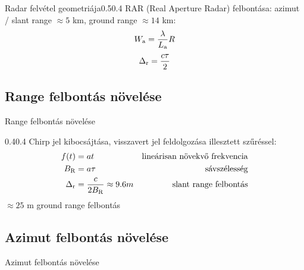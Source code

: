 \documentclass[aspectratio=169]{beamer}
\begin{document}
\begin{frame}{\ft}
    \begin{figp}{}{Radar felvétel geometriája}{0.5}{0.4}
        RAR (Real Aperture Radar) felbontása: azimut / slant range $\approx 5$ km, ground range $\approx 14$ km:
        $$ W_{\text{a}} = \frac{\lambda}{L_{\text{a}}} R $$
        $$ \Delta_{\text{r}} = \frac{c\tau}{2} $$
    \end{figp}
\end{frame}

\def\ft{Range felbontás növelése}
\subsection{\ft}

\begin{frame}{\ft}
    \begin{figp}{}{}{0.4}{0.4}
        Chirp jel kibocsájtása, visszavert jel feldolgozása illesztett szűréssel:
        \begin{align*}
            f(t) &= a t & \text{lineárisan növekvő frekvencia} \\
            B_{\text{R}} &= a \tau & \text{sávszélesség} \\
            \Delta_{\text{r}} &= \frac{c}{2 B_{\text{R}}} \approx 9.6 m & \text{slant range felbontás}
        \end{align*}
        $\approx 25$ m ground range felbontás
    \end{figp}
\end{frame}

\def\ft{Azimut felbontás növelése}
\subsection{\ft}

\begin{frame}{\ft}
    \begin{center}
    \begin{minipage}[c]{0.45\textwidth}
    \end{minipage}
    \hspace{10pt}
    \begin{minipage}[c]{0.45\textwidth}
    \end{minipage}
    \end{center}
\end{frame}
\end{document}
